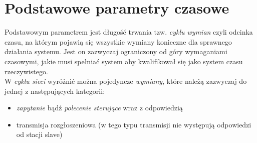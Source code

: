 \section{Podstawowe parametry czasowe}
Podstawowym parametrem jest długość trwania tzw. \textit{cyklu wymian} czyli odcinka czasu, na którym pojawią się wszystkie wymiany konieczne dla sprawnego działania systemu. Jest on zazwyczaj ograniczony od góry wymaganiami czasowymi, jakie musi spełniać system aby kwalifikował się jako system czasu rzeczywistego.\\
W \textit{cyklu sieci} wyróżnić można pojedyncze \textit{wymiany}, które należą zazwyczaj do jednej z następujących kategorii:
\begin{itemize}
	\item \textit{zapytanie} bądź \textit{polecenie sterujące} wraz z odpowiedzią
	\item transmisja rozgłoszeniowa (w tego typu transmisji nie występują odpowiedzi od stacji slave)
\end{itemize}

